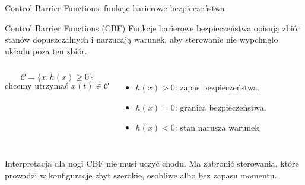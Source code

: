 \begin{frame}{Control Barrier Functions: funkcje barierowe bezpieczeństwa}
\begin{block}{Control Barrier Functions (CBF)}
Funkcje barierowe bezpieczeństwa opisują zbiór stanów dopuszczalnych i narzucają warunek, aby sterowanie nie wypchnęło układu poza ten zbiór.
\end{block}
\begin{columns}[T,onlytextwidth]
\[
\mathcal C = \{x: h(x)\ge 0\}
\]
\[
\text{chcemy utrzymać } x(t)\in\mathcal C
\]
\begin{itemize}
  \item $h(x)>0$: zapas bezpieczeństwa.
  \item $h(x)=0$: granica bezpieczeństwa.
  \item $h(x)<0$: stan narusza warunek.
\end{itemize}
\end{columns}
\begin{block}{Interpretacja dla nogi}
CBF nie musi uczyć chodu. Ma zabronić sterowania, które prowadzi w konfiguracje zbyt szerokie, osobliwe albo bez zapasu momentu.
\end{block}
\end{frame}

